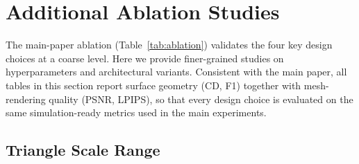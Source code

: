 \begin{table}[!htbp]
\centering
\caption{\textbf{Novel-view synthesis on ScanNet (zero-shot, 6 views).} Models trained on RE10K, evaluated without fine-tuning. Primitive rendering (Prim.) is each method's native rasterization; mesh rendering (Mesh) rasterizes the exported mesh.}
\label{tab:nvs_scannet}
\end{table}

\section{Additional Ablation Studies}
\label{sec:app_ablation}

The main-paper ablation (Table~\ref{tab:ablation}) validates the four key design choices at a coarse level. Here we provide finer-grained studies on hyperparameters and architectural variants. Consistent with the main paper, all tables in this section report surface geometry (CD, F1) together with mesh-rendering quality (PSNR, LPIPS), so that every design choice is evaluated on the same simulation-ready metrics used in the main experiments.




\subsection{Triangle Scale Range}
\label{sec:app_ablation_scale}

